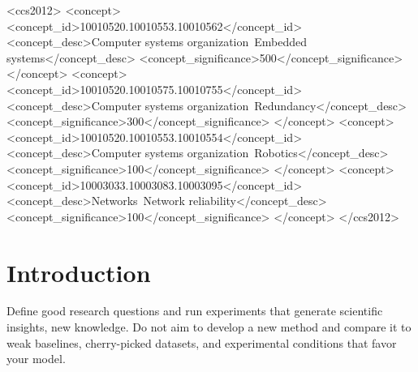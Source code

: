\documentclass[sigconf, review, nonacm]{acmart}
\begin{document}
\begin{CCSXML}
<ccs2012>
 <concept>
  <concept_id>10010520.10010553.10010562</concept_id>
  <concept_desc>Computer systems organization~Embedded systems</concept_desc>
  <concept_significance>500</concept_significance>
 </concept>
 <concept>
  <concept_id>10010520.10010575.10010755</concept_id>
  <concept_desc>Computer systems organization~Redundancy</concept_desc>
  <concept_significance>300</concept_significance>
 </concept>
 <concept>
  <concept_id>10010520.10010553.10010554</concept_id>
  <concept_desc>Computer systems organization~Robotics</concept_desc>
  <concept_significance>100</concept_significance>
 </concept>
 <concept>
  <concept_id>10003033.10003083.10003095</concept_id>
  <concept_desc>Networks~Network reliability</concept_desc>
  <concept_significance>100</concept_significance>
 </concept>
</ccs2012>
\end{CCSXML}




\maketitle

\section{Introduction}




\begin{tcolorbox}[title=What is Ego-less Research?,colback=red!20]
Define good research questions and run experiments that generate scientific insights, \ie new knowledge.
Do not aim to develop a new method and compare it to weak baselines, cherry-picked datasets, and experimental conditions that favor your model.
\end{tcolorbox}
\end{document}
